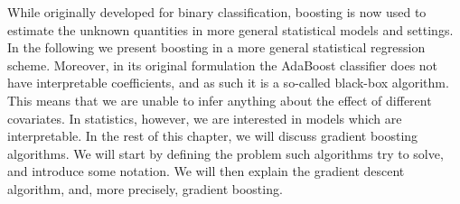 While originally developed for binary classification, boosting is now used to estimate the unknown quantities in more general statistical models and settings.
In the following we present boosting in a more general statistical regression scheme.
Moreover, in its original formulation the AdaBoost classifier does not have interpretable coefficients, and as such it is a so-called black-box algorithm.
This means that we are unable to infer anything about the effect of different covariates.
In statistics, however, we are interested in models which are interpretable.
In the rest of this chapter, we will discuss gradient boosting algorithms.
We will start by defining the problem such algorithms try to solve, and introduce some notation.
We will then explain the gradient descent algorithm, and, more precisely, gradient boosting.


